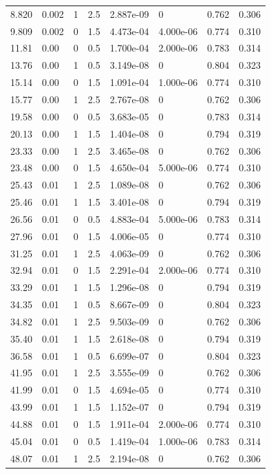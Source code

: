 \documentclass[preview]{standalone}
\begin{document}
{{\begin{tabular}{L{1.2cm}C{1.2cm} C{0.3cm}C{0.5cm} C{1.4cm}C{1.4cm} C{1.4cm}C{1.4cm}}
  8.820  &  0.002  & 1     & 2.5 &  2.887e-09  & 0  & 0.762 &  0.306   \\ 
  9.809  &  0.002  & 0     & 1.5 &  4.473e-04  & 4.000e-06  & 0.774 &  0.310   \\ 
  11.81  &  0.00  & 0     & 0.5 &  1.700e-04  & 2.000e-06  & 0.783 &  0.314   \\ 
  13.76  &  0.00  & 1     & 0.5 &  3.149e-08  & 0  & 0.804 &  0.323   \\ 
  15.14  &  0.00  & 0     & 1.5 &  1.091e-04  & 1.000e-06  & 0.774 &  0.310   \\ 
  15.77  &  0.00  & 1     & 2.5 &  2.767e-08  & 0  & 0.762 &  0.306   \\ 
  19.58  &  0.00  & 0     & 0.5 &  3.683e-05  & 0  & 0.783 &  0.314   \\ 
  20.13  &  0.00  & 1     & 1.5 &  1.404e-08  & 0  & 0.794 &  0.319   \\ 
  23.33  &  0.00  & 1     & 2.5 &  3.465e-08  & 0  & 0.762 &  0.306   \\ 
  23.48  &  0.00  & 0     & 1.5 &  4.650e-04  & 5.000e-06  & 0.774 &  0.310   \\ 
  25.43  &  0.01  & 1     & 2.5 &  1.089e-08  & 0  & 0.762 &  0.306   \\ 
  25.46  &  0.01  & 1     & 1.5 &  3.401e-08  & 0  & 0.794 &  0.319   \\ 
  26.56  &  0.01  & 0     & 0.5 &  4.883e-04  & 5.000e-06  & 0.783 &  0.314   \\ 
  27.96  &  0.01  & 0     & 1.5 &  4.006e-05  & 0  & 0.774 &  0.310   \\ 
  31.25  &  0.01  & 1     & 2.5 &  4.063e-09  & 0  & 0.762 &  0.306   \\ 
  32.94  &  0.01  & 0     & 1.5 &  2.291e-04  & 2.000e-06  & 0.774 &  0.310   \\ 
  33.29  &  0.01  & 1     & 1.5 &  1.296e-08  & 0  & 0.794 &  0.319   \\ 
  34.35  &  0.01  & 1     & 0.5 &  8.667e-09  & 0  & 0.804 &  0.323   \\ 
  34.82  &  0.01  & 1     & 2.5 &  9.503e-09  & 0  & 0.762 &  0.306   \\ 
  35.40  &  0.01  & 1     & 1.5 &  2.618e-08  & 0  & 0.794 &  0.319   \\ 
  36.58  &  0.01  & 1     & 0.5 &  6.699e-07  & 0  & 0.804 &  0.323   \\ 
  41.95  &  0.01  & 1     & 2.5 &  3.555e-09  & 0  & 0.762 &  0.306   \\ 
  41.99  &  0.01  & 0     & 1.5 &  4.694e-05  & 0  & 0.774 &  0.310   \\ 
  43.99  &  0.01  & 1     & 1.5 &  1.152e-07  & 0  & 0.794 &  0.319   \\ 
  44.88  &  0.01  & 0     & 1.5 &  1.911e-04  & 2.000e-06  & 0.774 &  0.310   \\ 
  45.04  &  0.01  & 0     & 0.5 &  1.419e-04  & 1.000e-06  & 0.783 &  0.314   \\ 
  48.07  &  0.01  & 1     & 2.5 &  2.194e-08  & 0  & 0.762 &  0.306   \\ 
\hline 
\end{tabular} 

}}
\end{document}
